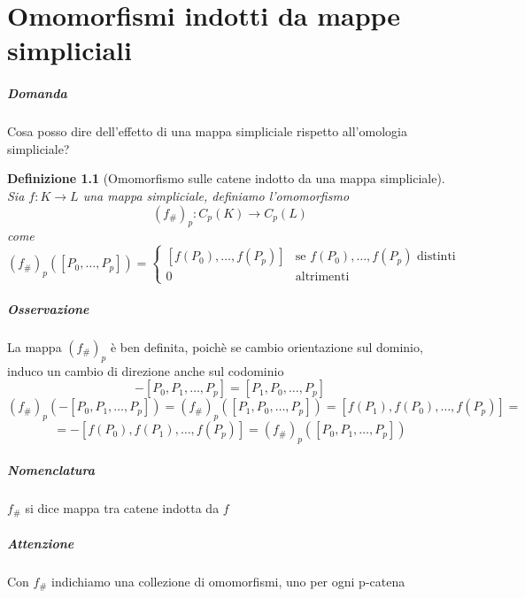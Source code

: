 \documentclass[a4paper]{report}
\newtheorem{definition}{Definizione}
\newcommand{\ra}{\ensuremath{\rightarrow}}
\newcommand{\shrp}[1]{\ensuremath{({#1}_\#)_p}}
\begin{document}
\chapter{Omomorfismi indotti da mappe simpliciali}
\paragraph{Domanda} Cosa posso dire dell'effetto di una mappa simpliciale rispetto all'omologia simpliciale?
\begin{definition}[Omomorfismo sulle catene indotto da una mappa simpliciale]
    Sia $f:K\ra L$ una mappa simpliciale, definiamo l'omomorfismo
    \[
        \shrp{f}:C_p(K)\ra C_p(L)    
    \]
    come
    \[
        \shrp{f}([P_0,\dots,P_p])=\begin{cases}
            [f(P_0),\dots,f(P_p)] & \text{se } f(P_0),\dots,f(P_p)\text{ distinti}\\
            0 & \text{altrimenti}
        \end{cases}  
    \]
\end{definition}
\paragraph{Osservazione} La mappa \shrp{f} è ben definita, poichè se cambio orientazione sul dominio, induco un cambio di direzione anche sul codominio
\[
    -[P_0,P_1,\dots,P_p]=[P_1,P_0,\dots,P_p]    
\]
\[
    \shrp{f}(-[P_0,P_1,\dots,P_p])=\shrp{f}([P_1,P_0,\dots,P_p])=[f(P_1),f(P_0),\dots,f(P_p)]=   
\]
\[
    =-[f(P_0),f(P_1),\dots,f(P_p)]=\shrp{f}([P_0,P_1,\dots,P_p])
\]
\paragraph{Nomenclatura} $f_\#$ si dice mappa tra catene indotta da $f$
\paragraph{Attenzione} Con $f_\#$ indichiamo una collezione di omomorfismi, uno per ogni p-catena
\end{document}
